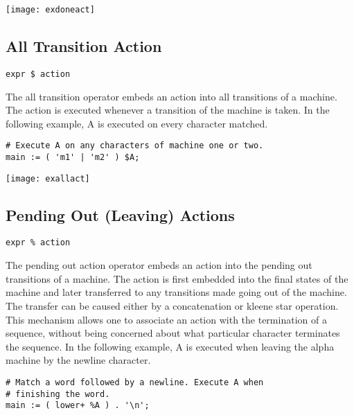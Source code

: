 \documentclass[letterpaper,11pt,oneside]{book}
\newcommand{\verbspace}{\vspace{10pt}}
\newcommand{\graphspace}{\vspace{10pt}}
\newenvironment{inline_code}{\def\baselinestretch{1}\vspace{12pt}\small}{}
\begin{document}
\graphspace
\begin{center}
\texttt{[image: exdoneact]}
\end{center}
\graphspace


\subsection{All Transition Action}

\verb|expr $ action|
\verbspace

The all transition operator embeds an action into all transitions of a machine.
The action is executed whenever a transition of the machine is taken. In the
following example, A is executed on every character matched.

\begin{inline_code}
\begin{verbatim}
# Execute A on any characters of machine one or two.
main := ( 'm1' | 'm2' ) $A;
\end{verbatim}
\end{inline_code}

\graphspace
\begin{center}
\texttt{[image: exallact]}
\end{center}
\graphspace


\subsection{Pending Out (Leaving) Actions}
\label{out-actions}

\verb|expr % action|
\verbspace

The pending out action operator embeds an action into the pending out
transitions of a machine. The action is first embedded into the final states of
the machine and later transferred to any transitions made going out of the
machine. The transfer can be caused either by a concatenation or kleene star
operation.  This mechanism allows one to associate an action with the
termination of a sequence, without being concerned about what particular
character terminates the sequence.  In the following example, A is executed
when leaving the alpha machine by the newline character.

\begin{inline_code}
\begin{verbatim}
# Match a word followed by a newline. Execute A when 
# finishing the word.
main := ( lower+ %A ) . '\n';
\end{verbatim}
\end{inline_code}
\end{document}
